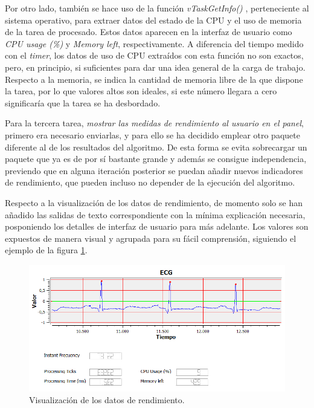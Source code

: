        
        Por otro lado,  también se hace uso de la función \textit{vTaskGetInfo()} \cite{FreeRTOS}, perteneciente al sistema operativo, para extraer datos del estado de la CPU y el uso de memoria de la tarea de procesado. Estos datos aparecen en la interfaz de usuario como \textit{CPU usage (\%)} y \textit{Memory left}, respectivamente. A diferencia del tiempo medido con el \textit{timer}, los datos de uso de CPU extraídos con esta función no son exactos, pero, en principio, si suficientes para dar una idea general de la carga de trabajo. Respecto a la memoria, se indica la cantidad de memoria libre de la que dispone la tarea, por lo que valores altos son ideales, si este número llegara a cero significaría que la tarea se ha desbordado. 
        
        Para la tercera tarea, \textit{mostrar las medidas de rendimiento al usuario en el panel}, primero era necesario enviarlas, y para ello se ha decidido emplear otro paquete diferente al de los resultados del algoritmo. De esta forma se evita sobrecargar un paquete que ya es de por sí bastante grande y además se consigue independencia, previendo que en alguna iteración posterior se puedan añadir nuevos indicadores de rendimiento, que pueden incluso no depender de la ejecución del algoritmo.
        
        Respecto a la visualización de los datos de rendimiento, de momento solo se han añadido las salidas de texto correspondiente con la mínima explicación necesaria, posponiendo los detalles de interfaz de usuario para más adelante. Los valores son expuestos de manera visual y agrupada para su fácil comprensión, siguiendo el ejemplo de la figura \ref{fig:performance}.
        
        \begin{figure}[H]
                \centering
                        \includegraphics[width = 0.9 \linewidth]{figuras/Performance.PNG}
                \caption{Visualización de los datos de rendimiento.}
                \label{fig:performance}
        \end{figure}
        
